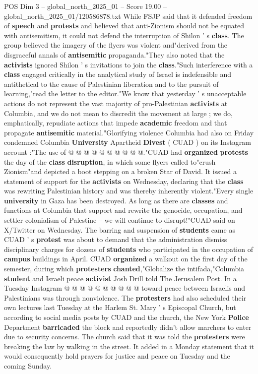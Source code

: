 \begin{textsample}{POS Dim 3 – global\_north\_2025\_01 – Score 19.00 – global\_north\_2025\_01/120586878.txt}
While FSJP said that it defended freedom of \textbf{speech} and \textbf{protests} and believed that anti-Zionism should not be equated with antisemitism, it could not defend the interruption of Shilon ' s \textbf{class}.
The group believed the imagery of the flyers was violent and"derived from the disgraceful annals of \textbf{antisemitic} propaganda."They also noted that the \textbf{activists} ignored Shilon ' s invitations to join the \textbf{class}."Such interference with a \textbf{class} engaged critically in the analytical study of Israel is indefensible and antithetical to the cause of Palestinian liberation and to the pursuit of learning,"read the letter to the editor."We know that yesterday ' s unacceptable actions do not represent the vast majority of pro-Palestinian \textbf{activists} at Columbia, and we do not mean to discredit the movement at large ; we do, emphatically, repudiate actions that impede \textbf{academic} freedom and that propagate \textbf{antisemitic} material."Glorifying violence Columbia had also on Friday condemned Columbia \textbf{University} Apartheid \textbf{Divest} ( CUAD ) on its Instagram account :"The use of @ @ @ @ @ @ @ @ @ @."CUAD had \textbf{organized} \textbf{protests} the day of the \textbf{class} \textbf{disruption}, in which some flyers called to"crush Zionism"and depicted a boot stepping on a broken Star of David.
It issued a statement of support for the \textbf{activists} on Wednesday, declaring that the \textbf{class} was rewriting Palestinian history and was thereby inherently violent."Every single \textbf{university} in Gaza has been destroyed.
As long as there are \textbf{classes} and functions at Columbia that support and rewrite the genocide, occupation, and settler colonialism of Palestine -- we will continue to disrupt!"CUAD said on X/Twitter on Wednesday.
The barring and suspension of \textbf{students} came as CUAD ' s \textbf{protest} was about to demand that the administration dismiss disciplinary charges for dozens of \textbf{students} who participated in the occupation of \textbf{campus} buildings in April.
CUAD \textbf{organized} a walkout on the first day of the semester, during which \textbf{protesters} \textbf{chanted},"Globalize the intifada,"Columbia \textbf{student} and Israeli peace \textbf{activist} Josh Drill told The Jerusalem Post.
In a Tuesday Instagram @ @ @ @ @ @ @ @ @ @ toward peace between Israelis and Palestinians was through nonviolence.
The \textbf{protesters} had also scheduled their own lectures last Tuesday at the Harlem St.
Mary ' s Episcopal Church, but according to social media posts by CUAD and the church, the New York \textbf{Police} Department \textbf{barricaded} the block and reportedly didn't allow marchers to enter due to security concerns.
The church said that it was told the \textbf{protesters} were breaking the law by walking in the street.
It added in a Monday statement that it would consequently hold prayers for justice and peace on Tuesday and the coming Sunday.

\end{textsample}
